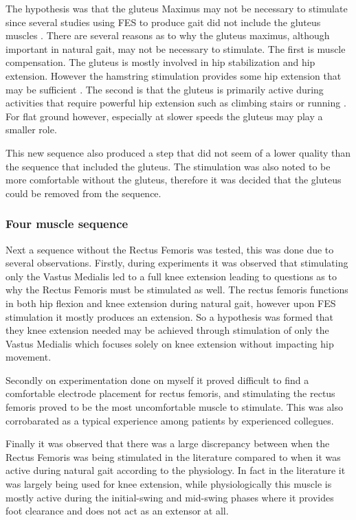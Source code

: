 The hypothesis was that the gluteus Maximus may not be necessary to stimulate since several studies using FES to produce gait did not include the gluteus muscles \cite{aout_effects_2023}. There are several reasons as to why the gluteus maximus, although important in natural gait, may not be necessary to stimulate. The first is muscle compensation. The gluteus is mostly involved in hip stabilization and hip extension. However the hamstring stimulation provides some hip extension that may be sufficient \cite{kang_activation_2013}. The second is that the gluteus is primarily active during activities that require powerful hip extension such as climbing stairs or running \cite{noauthor_gluteus_nodate}. For flat ground however, especially at slower speeds the gluteus may play a smaller role. 

This new sequence also produced a step that did not seem of a lower quality than the sequence that included the gluteus. The stimulation was also noted to be more comfortable without the gluteus, therefore it was decided that the gluteus could be removed from the sequence.



\subsubsection{Four muscle sequence}
Next a sequence without the Rectus Femoris was tested, this was done due to several observations. Firstly, during experiments it was observed that stimulating only the Vastus Medialis led to a full knee extension leading to questions as to why the Rectus Femoris must be stimulated as well. The rectus femoris functions in both hip flexion and knee extension during natural gait, however upon FES stimulation it mostly produces an extension. So a hypothesis was formed that they knee extension needed may be achieved through stimulation of only the Vastus Medialis which focuses solely on knee extension without impacting hip movement. 

Secondly on experimentation done on myself it proved difficult to find a comfortable electrode placement for rectus femoris, and stimulating the rectus femoris proved to be the most uncomfortable muscle to stimulate. This was also corrobarated as a typical experience among patients by experienced collegues. 

Finally it was observed that there was a large discrepancy between when the Rectus Femoris was being stimulated in the literature compared to when it was active during natural gait according to the physiology. In fact in the literature it was largely being used for knee extension, while physiologically this muscle is mostly active during the initial-swing and mid-swing phases where it provides foot clearance and does not act as an extensor at all. 

